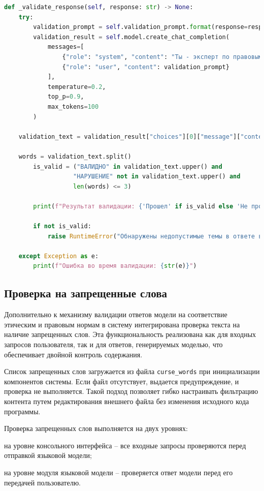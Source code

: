 \begin{lstlisting}[caption={Метод валидации ответа}, label=lst:model_validate, language=Python]
def _validate_response(self, response: str) -> None:
	try:
		validation_prompt = self.validation_prompt.format(response=response)
		validation_result = self.model.create_chat_completion(
			messages=[
				{"role": "system", "content": "Ты - эксперт по правовым и этическим нормам РФ."},
				{"role": "user", "content": validation_prompt}
			],
			temperature=0.2,
			top_p=0.9,
			max_tokens=100
		)

	validation_text = validation_result["choices"][0]["message"]["content"]

	words = validation_text.split()
		is_valid = ("ВАЛИДНО" in validation_text.upper() and
				   "НАРУШЕНИЕ" not in validation_text.upper() and
				   len(words) <= 3)

		print(f"Результат валидации: {'Прошел' if is_valid else 'Не прошел'}")

		if not is_valid:
			raise RuntimeError("Обнаружены недопустимые темы в ответе во время валидации.")

	except Exception as e:
		print(f"Ошибка во время валидации: {str(e)}")
\end{lstlisting}

\subsection{Проверка на запрещенные слова}
Дополнительно к механизму валидации ответов модели на соответствие этическим и правовым нормам в систему интегрирована проверка текста на наличие запрещенных слов. Эта функциональность реализована как для входных запросов пользователя, так и для ответов, генерируемых моделью, что обеспечивает двойной контроль содержания.

Список запрещенных слов загружается из файла \texttt{curse\_words} при инициализации компонентов системы. Если файл отсутствует, выдается предупреждение, и проверка не выполняется. Такой подход позволяет гибко настраивать фильтрацию контента путем редактирования внешнего файла без изменения исходного кода программы.

Проверка запрещенных слов выполняется на двух уровнях:
\begin{enumdescript}
	\item на уровне консольного интерфейса -- все входные запросы проверяются перед отправкой языковой модели;
	\item на уровне модуля языковой модели -- проверяется ответ модели перед его передачей пользователю.
\end{enumdescript}

